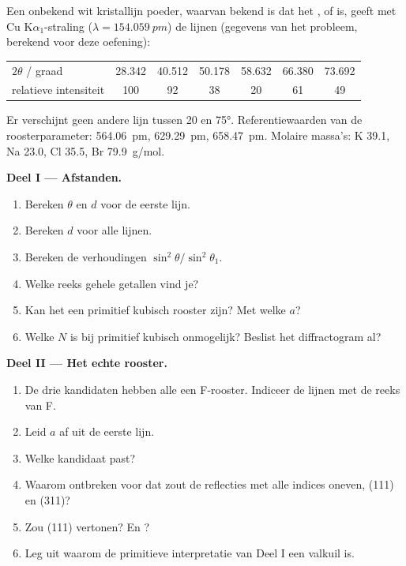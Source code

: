 \begin{problem}
\label{pb:b3:x-ray-diffraction:1}
Een onbekend wit kristallijn poeder, waarvan bekend is dat het ,
 of  is, geeft met Cu K$\alpha_1$-straling ($\lambda = \qty{154.059}{pm}$) de lijnen (gegevens van het
probleem, berekend voor deze oefening):
\begin{center}\small
\begin{tabular}{lcccccc}
\hline
$2\theta$ / graad & 28.342 & 40.512 & 50.178 & 58.632 & 66.380 & 73.692 \\
relatieve intensiteit & 100 & 92 & 38 & 20 & 61 & 49 \\ \hline
\end{tabular}
\end{center}
Er verschijnt geen andere lijn tussen 20 en \ang{75}. Referentiewaarden van
de roosterparameter:
 \qty{564.06}{pm},  \qty{629.29}{pm},  \qty{658.47}{pm}. Molaire massa's:
K 39.1, Na 23.0, Cl 35.5, Br \qty{79.9}{g/mol}.

\medskip\noindent\textbf{Deel I --- Afstanden.}
\begin{enumerate}
  \item Bereken $\theta$ en $d$ voor de eerste lijn.
  \item Bereken $d$ voor alle lijnen.
  \item Bereken de verhoudingen $\sin^2\theta/\sin^2\theta_1$.
  \item Welke reeks gehele getallen vind je?
  \item Kan het een primitief kubisch rooster zijn? Met welke $a$?
  \item Welke $N$ is bij primitief kubisch onmogelijk? Beslist het
        diffractogram al?
\end{enumerate}

\medskip\noindent\textbf{Deel II --- Het echte rooster.}
\begin{enumerate}[resume]
  \item De drie kandidaten hebben alle een F-rooster. Indiceer de lijnen met
        de reeks van F.
  \item Leid $a$ af uit de eerste lijn.
  \item Welke kandidaat past?
  \item Waarom ontbreken voor dat zout de reflecties met alle indices
        oneven, (111) en (311)?
  \item Zou  (111) vertonen? En ?
  \item Leg uit waarom de primitieve interpretatie van Deel I een valkuil is.
\end{enumerate}


\end{problem}
